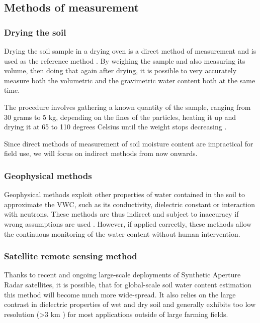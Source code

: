 \subsection{Methods of measurement}
\subsubsection{Drying the soil}
Drying the soil sample in a drying oven is a direct method of measurement and is used as the reference method \cite{webster_humidity_1998}. By weighing the sample and also measuring its volume, then doing that again after drying, it is possible to very accurately measure both the volumetric and the gravimetric water content both at the same time.

The procedure involves gathering a known quantity of the sample, ranging from 30 grams to 5 kg, depending on the fines of the particles, heating it up and drying it at 65 to 110 degrees Celsius until the weight stops decreasing \cite{department_of_sustainable_natural_resources_soil_2024,myjove_corporation_determination_2024, paul_soil_2007}.

Since direct methods of measurement of soil moisture content are impractical for field use, we will focus on indirect methods from now onwards.

\subsubsection{Geophysical methods}
Geophysical methods exploit other properties of water contained in the soil to approximate the VWC, such as its conductivity, dielectric constant or interaction with neutrons. These methods are thus indirect and subject to inaccuracy if wrong assumptions are used \cite{webster_humidity_1998}. However, if applied correctly, these methods allow the continuous monitoring of the water content without human intervention.

\subsubsection{Satellite remote sensing method}
Thanks to recent and ongoing large-scale deployments of Synthetic Aperture Radar satellites, it is possible, that for global-scale soil water content estimation this method will become much more wide-spread. It also relies on the large contrast in dielectric properties of wet and dry soil and generally exhibits too low resolution (>3 km \cite{podest_applications_nodate,eos_data_analytics_remote_2022}) for most applications outside of large farming fields.

